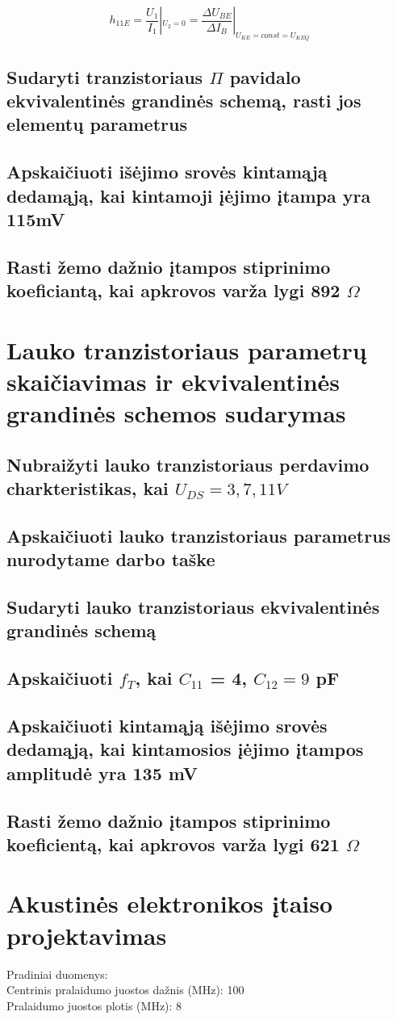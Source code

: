 \documentclass[11pt,a4paper]{article}
\begin{document}
\[h_{11E} = \frac{U_1}{I_1}|_{U_2 = 0} = \frac{\Delta U_{BE}}{\Delta I_B}|_{U_{KE} = const = U_{KEQ}}\]

\subsection{Sudaryti tranzistoriaus $\Pi$ pavidalo ekvivalentinės grandinės schemą, rasti jos elementų parametrus}
\subsection{Apskaičiuoti išėjimo srovės kintamąją dedamąją, kai kintamoji įėjimo įtampa yra 115mV}
\subsection{Rasti žemo dažnio įtampos stiprinimo koeficiantą, kai apkrovos varža lygi 892 $\Omega$ }

\section{Lauko tranzistoriaus parametrų skaičiavimas ir ekvivalentinės grandinės schemos sudarymas}
\subsection{Nubraižyti lauko tranzistoriaus perdavimo charkteristikas, kai $U_{DS} = 3,7,11 V$}
\subsection{Apskaičiuoti lauko tranzistoriaus parametrus nurodytame darbo taške}
\subsection{Sudaryti lauko tranzistoriaus ekvivalentinės grandinės schemą}
\subsection{Apskaičiuoti $f_{T}$, kai $C_{11}$ = 4, $C_{12} = 9$ pF}
\subsection{Apskaičiuoti kintamąją išėjimo srovės dedamąją, kai kintamosios įėjimo įtampos amplitudė yra 135 mV}
\subsection{Rasti žemo dažnio įtampos stiprinimo koeficientą, kai apkrovos varža lygi 621 $\Omega$}

\section{Akustinės elektronikos įtaiso projektavimas}
Pradiniai duomenys:\\
Centrinis pralaidumo juostos dažnis (MHz): 100\\
Pralaidumo juostos plotis (MHz): 8
\end{document}
